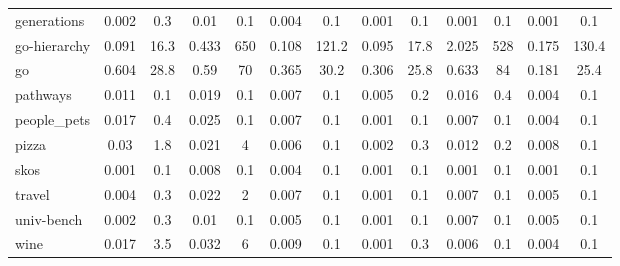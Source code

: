 {\begin{table*}[h]
\begin{tabular}{| l | c  c | c  c | c  c | c  c | c  c | c  c |}
generations                 & 0.002 & 0.3  & 0.01  & 0.1 & 0.004 & 0.1   & 0.001 & 0.1  & 0.001 & 0.1 & 0.001 & 0.1   \\
go-hierarchy                & 0.091 & 16.3 & 0.433 & 650 & 0.108 & 121.2 & 0.095 & 17.8 & 2.025 & 528 & 0.175 & 130.4 \\
go                          & 0.604 & 28.8 & 0.59  & 70  & 0.365 & 30.2  & 0.306 & 25.8 & 0.633 & 84  & 0.181 & 25.4  \\
pathways                    & 0.011 & 0.1  & 0.019 & 0.1 & 0.007 & 0.1   & 0.005 & 0.2  & 0.016 & 0.4 & 0.004 & 0.1   \\
people\_pets                & 0.017 & 0.4  & 0.025 & 0.1 & 0.007 & 0.1   & 0.001 & 0.1  & 0.007 & 0.1 & 0.004 & 0.1   \\
pizza                       & 0.03  & 1.8  & 0.021 & 4   & 0.006 & 0.1   & 0.002 & 0.3  & 0.012 & 0.2 & 0.008 & 0.1   \\
skos                        & 0.001 & 0.1  & 0.008 & 0.1 & 0.004 & 0.1   & 0.001 & 0.1  & 0.001 & 0.1 & 0.001 & 0.1   \\
travel                      & 0.004 & 0.3  & 0.022 & 2   & 0.007 & 0.1   & 0.001 & 0.1  & 0.007 & 0.1 & 0.005 & 0.1   \\
univ-bench                  & 0.002 & 0.3  & 0.01  & 0.1 & 0.005 & 0.1   & 0.001 & 0.1  & 0.007 & 0.1 & 0.005 & 0.1   \\
wine                        & 0.017 & 3.5  & 0.032 & 6   & 0.009 & 0.1   & 0.001 & 0.3  & 0.006 & 0.1 & 0.004 & 0.1  \\
    \hline
  \end{tabular}
\end{table*}
}

